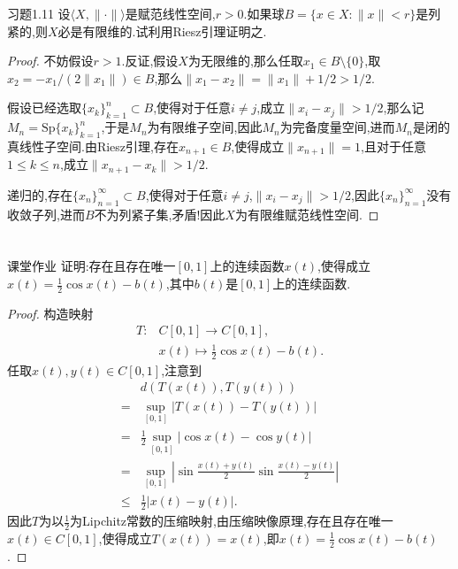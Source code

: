 \documentclass[lang = cn, scheme = chinese]{elegantbook}
\begin{document}
	\begin{proposition}{习题1.11}
		设$\langle X,\|\cdot\|\rangle$是赋范线性空间,$r>0$.如果球$B=\{x\in X:\|x\|<r\}$是列紧的,则$X$必是有限维的.试利用Riesz引理证明之.
	\end{proposition}
	
	\begin{proof}
		不妨假设$r>1$.反证,假设$X$为无限维的,那么任取$x_1\in B\setminus\{0\}$,取$x_2=-x_1/(2\|x_1\|)\in B$,那么$\|x_1-x_2\|=\|x_1\|+1/2>1/2$.
		
		假设已经选取$\{ x_k \}_{k=1}^{n}\subset B$,使得对于任意$i\ne j$,成立$\|x_i-x_j\|>1/2$,那么记$M_n=\mathrm{Sp}\{ x_k \}_{k=1}^{n}$,于是$M_n$为有限维子空间,因此$M_n$为完备度量空间,进而$M_n$是闭的真线性子空间.由Riesz引理,存在$x_{n+1}\in B$,使得成立$\|x_{n+1}\|=1$,且对于任意$1\le k\le n$,成立$\|x_{n+1}-x_k\|>1/2$.
		
		递归的,存在$\{ x_n \}_{n=1}^{\infty}\subset B$,使得对于任意$i\ne j$,$\|x_i-x_j\|>1/2$,因此$\{ x_n \}_{n=1}^{\infty}$没有收敛子列,进而$B$不为列紧子集,矛盾!因此$X$为有限维赋范线性空间.
	\end{proof}
	
	\chapter{}
	
	\begin{proposition}{课堂作业}
		证明:存在且存在唯一$[0,1]$上的连续函数$x(t)$,使得成立$x(t)=\frac{1}{2}\cos x(t)-b(t)$,其中$b(t)$是$[0,1]$上的连续函数.
	\end{proposition}
	
	\begin{proof}
		构造映射
		\begin{align*}
			T:&C[0,1]\to C[0,1],\\
			&x(t)\mapsto \frac{1}{2}\cos x(t)-b(t).
		\end{align*}
		任取$x(t),y(t)\in C[0,1]$,注意到
		\begin{align*}
			&d(T(x(t)),T(y(t)))\\
			=&\sup_{[0,1]}|T(x(t))-T(y(t))|\\
			=&\frac{1}{2}\sup_{[0,1]}|\cos x(t)-\cos y(t)|\\
			=&\sup_{[0,1]}\left|\sin\frac{x(t)+y(t)}{2}\sin\frac{x(t)-y(t)}{2}\right|\\
			\le& \frac{1}{2}|x(t)-y(t)|.
		\end{align*}
		因此$T$为以$\frac{1}{2}$为Lipchitz常数的压缩映射,由压缩映像原理,存在且存在唯一$x(t)\in C[0,1]$,使得成立$T(x(t))=x(t)$,即$x(t)=\frac{1}{2}\cos x(t)-b(t)$.
	\end{proof}
	
\end{document}
